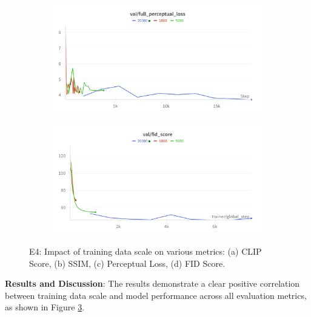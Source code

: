 \begin{figure}[htbp]
  \begin{subfigure}[b]{0.48\textwidth}
    \centering
    \includegraphics[width=\textwidth]{images/experiments/data_scale/perceptual.png}
    \label{fig:exp_data_scale_perceptual}
  \end{subfigure}
  \hfill
  \begin{subfigure}[b]{0.48\textwidth}
    \centering
    \includegraphics[width=\textwidth]{images/experiments/data_scale/fid.png}
    \label{fig:exp_data_scale_fid}
  \end{subfigure}

  \caption{E4: Impact of training data scale on various metrics: (a) CLIP Score, (b) SSIM, (c) Perceptual Loss, (d) FID Score.}
  \label{fig:exp_data_scale_metrics_grid}
\end{figure}

\textbf{Results and Discussion}: The results demonstrate a clear positive correlation between training data scale and model performance across all evaluation metrics, as shown in Figure \ref{fig:exp_data_scale_metrics_grid}.

